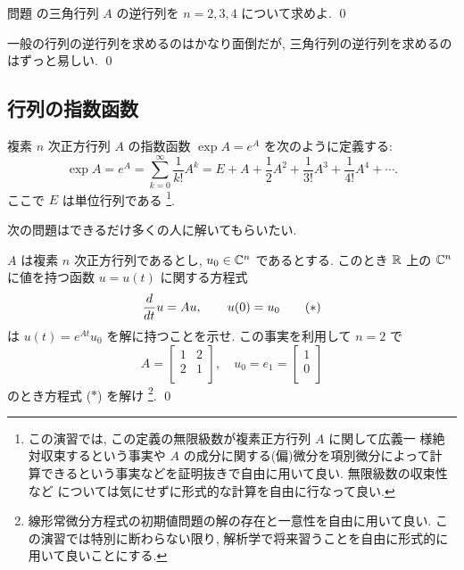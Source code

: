 \documentclass[12pt,twoside]{jarticle}
\begin{document}
\begin{question}
  問題  の三角行列 $A$ の逆行列を $n=2,3,4$ について求めよ.
  \qed 
\end{question}

\begin{guide}
  一般の行列の逆行列を求めるのはかなり面倒だが, 
  三角行列の逆行列を求めるのはずっと易しい. 
  \qed
\end{guide}


\subsection{行列の指数函数}
\label{sec:exp}

複素 $n$ 次正方行列 $A$ の指数函数 $\exp A = e^A$ を次のように定義する:
\begin{equation*}
  \exp A = e^A 
  = \sum_{k=0}^\infty \frac{1}{k!} A^k
  = E + A + \frac{1}{2}A^2 + \frac{1}{3!}A^3 + \frac{1}{4!}A^4 + \cdots.
\end{equation*}
ここで $E$ は単位行列である%
\footnote{この演習では, この定義の無限級数が複素正方行列 $A$ に関して広義一
  様絶対収束するという事実や $A$ の成分に関する(偏)微分を項別微分によって計
  算できるという事実などを証明抜きで自由に用いて良い.  無限級数の収束性など
  については気にせずに形式的な計算を自由に行なって良い.}.


次の問題はできるだけ多くの人に解いてもらいたい.

\begin{question}[定数係数線形常微分方程式の解]
  \label{q:1,2,2,1}
  $A$ は複素 $n$ 次正方行列であるとし, $u_0\in{\mathbb C}^n$ であるとする.
  このとき ${\mathbb R}$ 上の ${\mathbb C}^n$ に値を持つ函数 $u=u(t)$ に関する方程式
  \begin{equation*}
    \frac{d}{d t}u = Au, \qquad u(0) = u_0
    \tag{$*$}
  \end{equation*}
  は $u(t) = e^{At}u_0$ を解に持つことを示せ.  
  この事実を利用して $n=2$ で
  \begin{equation*}
    A = 
    \begin{bmatrix}
      1 & 2 \\
      2 & 1 \\
    \end{bmatrix},
    \quad
    u_0 = e_1 = 
    \begin{bmatrix}
      1 \\
      0 \\
    \end{bmatrix}
  \end{equation*}
  のとき方程式 ($*$) を解け%
  \footnote{線形常微分方程式の初期値問題の解の存在と一意性を自由に用いて良い.
    この演習では特別に断わらない限り, 
    解析学で将来習うことを自由に形式的に用いて良いことにする.}.
  \qed
\end{question}
\end{document}
